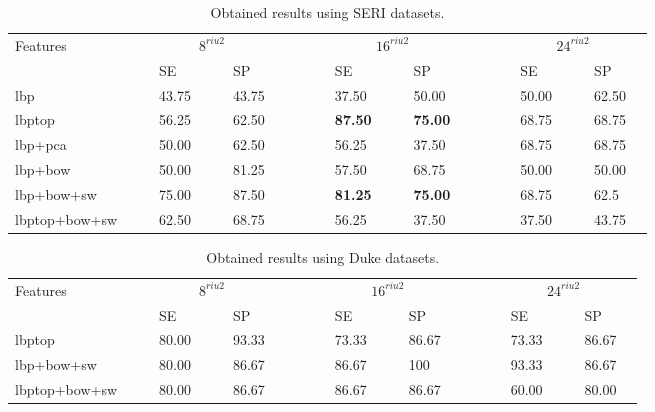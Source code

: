 \begin{tiny}
  \begin{table}[b]
\caption{Obtained results using SERI datasets.}%
\centering
\begin{tabular}{lcclcclcccclcclcccclcclc}
\toprule
Features 	& & &\multicolumn{4}{c}{$8^{riu2}$}&	 & & & &\multicolumn{4}{c}{$16^{riu2}$}& & & & &\multicolumn{4}{c}{$24^{riu2}$} &\\
  \cmidrule(l){2-8}  \cmidrule(l){10-16}  \cmidrule(l){18-24}
	       & & & SE & & & SP & & & & & SE & & & SP & & & & & SE & & & SP & \\
\midrule
  	\ac{lbp}					& & & 43.75 & & & 43.75 & & & & & 37.50 & & & 50.00 & & & & & 50.00 & & & 62.50 & \\
 	\ac{lbptop}				& & & 56.25 & & & 62.50 & & & & & \textbf{87.50} & & & \textbf{75.00} & & & & & 68.75 & & & 68.75 & \\
	\ac{lbp}+\ac{pca}		& & & 50.00 & & & 62.50 & & & & & 56.25 & & & 37.50 & & & & & 68.75 & & & 68.75 & \\
	\ac{lbp}+\ac{bow}		& & & 50.00 & & & 81.25 & & & & & 57.50 & & & 68.75 & & & & & 50.00 & & & 50.00 & \\
	\ac{lbp}+\ac{bow}+\acs{sw}		& & & 75.00 & & & 87.50 & & & & & \textbf{81.25} & & & \textbf{75.00} & & & & & 68.75 & & & 62.5 & \\
	\ac{lbptop}+\ac{bow}+\acs{sw}		& & & 62.50 & & & 68.75 & & & & & 56.25 & & & 37.50 & & & & & 37.50 & & & 43.75 & \\
\bottomrule
\end{tabular}
\label{tab:SERI-data}
\end{table}
\end{tiny}

\begin{tiny}
  \begin{table}[t]
\caption{Obtained results using Duke datasets.}%
\centering
\begin{tabular}{lcclcclcccclcclcccclcclc}
\toprule
Features 	& & &\multicolumn{4}{c}{$8^{riu2}$}&	 & & & &\multicolumn{4}{c}{$16^{riu2}$}& & & & &\multicolumn{4}{c}{$24^{riu2}$} &\\
  \cmidrule(l){2-8}  \cmidrule(l){10-16}  \cmidrule(l){18-24}
	       & & & SE & & & SP & & & & & SE & & & SP & & & & & SE & & & SP & \\
\midrule
 	\ac{lbptop}				& & & 80.00& & & 93.33 & & & & & 73.33 & & & 86.67 & & & & & 73.33 & & & 86.67 & \\
	\ac{lbp}+\ac{bow}+\acs{sw}		& & & 80.00 & & & 86.67 & & & & & 86.67 & & & 100 & & & & &93.33 & & & 86.67 & \\
	\ac{lbptop}+\ac{bow}+\acs{sw}		& & & 80.00 & & & 86.67 & & & & & 86.67 & & & 86.67 & & & & & 60.00 & & & 80.00 & \\
\bottomrule
\end{tabular}
\label{tab:Duke-data}
\end{table}
\end{tiny}

